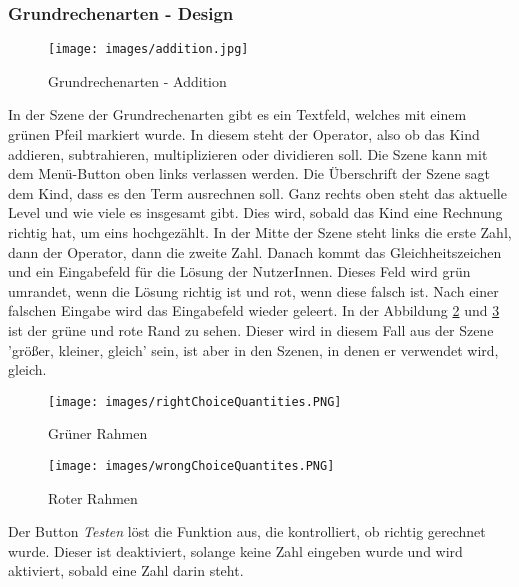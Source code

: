 \subsubsection{Grundrechenarten - Design}
\begin{figure}[htbp]
  \centering
  \texttt{[image: images/addition.jpg]}
  \caption{Grundrechenarten - Addition}
  \label{basicOperation}
\end{figure}
In der Szene der Grundrechenarten gibt es ein Textfeld, welches mit einem grünen Pfeil markiert wurde. In diesem steht der Operator, also ob das Kind addieren, subtrahieren, multiplizieren oder dividieren soll. Die Szene kann mit dem Menü-Button oben links verlassen werden. Die Überschrift der Szene sagt dem Kind, dass es den Term ausrechnen soll. Ganz rechts oben steht das aktuelle Level und wie viele es insgesamt gibt. Dies wird, sobald das Kind eine Rechnung richtig hat, um eins hochgezählt. In der Mitte der Szene steht links die erste Zahl, dann der Operator, dann die zweite Zahl. Danach kommt das Gleichheitszeichen und ein Eingabefeld für die Lösung der NutzerInnen. Dieses Feld wird grün umrandet, wenn die Lösung richtig ist und rot, wenn diese falsch ist. Nach einer falschen Eingabe wird das Eingabefeld wieder geleert. In der Abbildung \ref{greenBorder} und \ref{redBorder} ist der grüne und rote Rand zu sehen. Dieser wird in diesem Fall aus der Szene 'größer, kleiner, gleich' sein, ist aber in den Szenen, in denen er verwendet wird, gleich. 
\begin{figure}[htbp]
  \centering
  \texttt{[image: images/rightChoiceQuantities.PNG]}
  \caption{Grüner Rahmen}
  \label{greenBorder}
\end{figure}
\begin{figure}[htbp]
  \centering
  \texttt{[image: images/wrongChoiceQuantites.PNG]}
  \caption{Roter Rahmen}
  \label{redBorder}
\end{figure}
Der Button \textit{Testen} löst die Funktion aus, die kontrolliert, ob richtig gerechnet wurde. Dieser ist deaktiviert, solange keine Zahl eingeben wurde und wird aktiviert, sobald eine Zahl darin steht.
